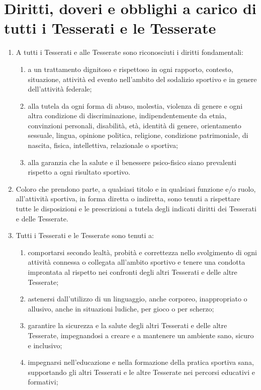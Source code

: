 \documentclass{djtsdoc}
\begin{document}
	\section{Diritti, doveri e obblighi a carico di tutti i Tesserati e le Tesserate}
	\begin{enumerate}
		\item A tutti i Tesserati e alle Tesserate sono riconosciuti i diritti fondamentali:
		\begin{enumerate}
			\item a un trattamento dignitoso e rispettoso in ogni rapporto, contesto, situazione, attività ed evento nell'ambito del sodalizio sportivo e in genere dell'attività federale;
			\item alla tutela da ogni forma di abuso, molestia, violenza di genere e ogni altra condizione di	discriminazione, indipendentemente da etnia, convinzioni personali, disabilità, età, identità di	genere, orientamento sessuale, lingua, opinione politica, religione, condizione patrimoniale, di 	nascita, fisica, intellettiva, relazionale o sportiva;
			\item alla garanzia che la salute e il benessere psico-fisico siano prevalenti rispetto a ogni risultato sportivo.
		\end{enumerate}
		\item Coloro che prendono parte, a qualsiasi titolo e in qualsiasi funzione e/o ruolo, all'attività sportiva, in forma diretta o indiretta, sono tenuti a rispettare tutte le disposizioni e le prescrizioni a tutela degli indicati diritti dei Tesserati e delle Tesserate.
		\item Tutti i Tesserati e le Tesserate sono tenuti a:
		\begin{enumerate}
			\item comportarsi secondo lealtà, probità e correttezza nello svolgimento di ogni attività connessa o	collegata all'ambito sportivo e tenere una condotta improntata al rispetto nei confronti degli	altri Tesserati e delle altre Tesserate;
			\item astenersi dall'utilizzo di un linguaggio, anche corporeo, inappropriato o allusivo, anche in	situazioni ludiche, per gioco o per scherzo;
			\item garantire la sicurezza e la salute degli altri Tesserati e delle altre Tesserate, impegnandosi a	creare e a mantenere un ambiente sano, sicuro e inclusivo;
			\item impegnarsi nell'educazione e nella formazione della pratica sportiva sana, supportando gli 	altri Tesserati e le altre Tesserate nei percorsi educativi e formativi;

\end{enumerate}
\end{enumerate}
\end{document}
